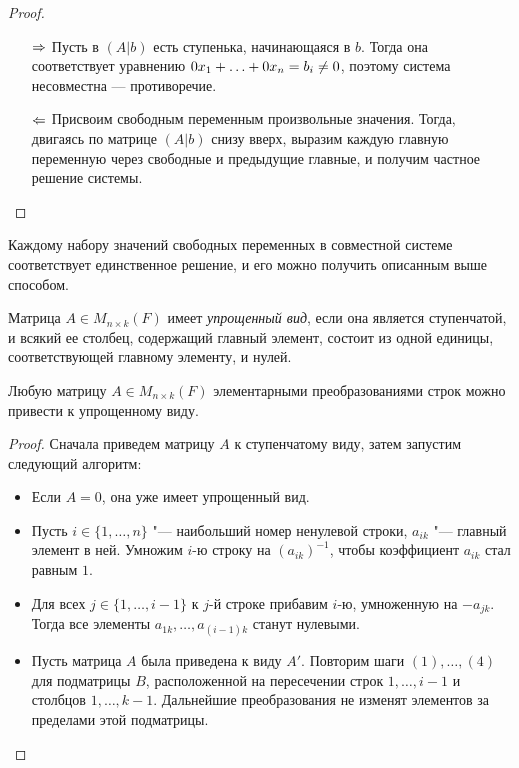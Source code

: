 \begin{proof}~
	\begin{itemize}
		\item[$\Rightarrow$] Пусть в $(A|b)$ есть ступенька, начинающаяся в $b$. Тогда она соответствует уравнению $0x_1 + \dots \hm{+} 0x_n = b_i \ne 0$, поэтому система несовместна --- противоречие.
		\item[$\Leftarrow$] Присвоим свободным переменным произвольные значения. Тогда, двигаясь по матрице $(A|b)$ снизу вверх, выразим каждую главную переменную через свободные и предыдущие главные, и получим частное решение системы.\qedhere
	\end{itemize}
\end{proof}

\begin{note}
	Каждому набору значений свободных переменных в совместной системе соответствует единственное решение, и его можно получить описанным выше способом.
\end{note}

\begin{definition}
	Матрица $A \in M_{n \times k}(F)$ имеет \textit{упрощенный вид}, если она является ступенчатой, и всякий ее столбец, содержащий главный элемент, состоит из одной единицы, соответствующей главному элементу, и нулей.
\end{definition}

\begin{theorem}
	Любую матрицу $A \in M_{n \times k}(F)$ элементарными преобразованиями строк можно привести к упрощенному виду.
\end{theorem}

\begin{proof}
	Сначала приведем матрицу $A$ к ступенчатому виду, затем запустим следующий алгоритм:
	\begin{itemize}
		\item Если $A = 0$, она уже имеет упрощенный вид.
		\item Пусть $i \in \{1, \dotsc, n\}$ "--- наибольший номер ненулевой строки, $a_{ik}$ "--- главный элемент в ней. Умножим $i$-ю строку на $(a_{ik})^{-1}$, чтобы коэффициент $a_{ik}$ стал равным $1$.
		\item Для всех $j \in \{1, \dots, i - 1\}$ к $j$-й строке прибавим $i$-ю, умноженную на $-a_{jk}$. Тогда все элементы $a_{1k}, \dots, a_{(i-1)k}$ станут нулевыми.
		\item Пусть матрица $A$ была приведена к виду $A'$. Повторим шаги $(1), \dotsc, (4)$ для подматрицы $B$, расположенной на пересечении строк $1, \dotsc, i - 1$ и столбцов $1,\dotsc, k - 1$. Дальнейшие преобразования не изменят элементов за пределами этой подматрицы.\qedhere
	\end{itemize}
\end{proof}

